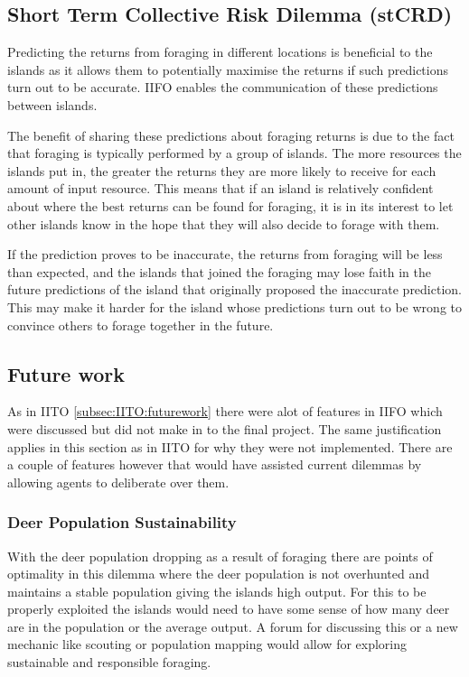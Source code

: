 \subsection{Short Term Collective Risk Dilemma (stCRD)}
\label{subsec:IIFO:stCRD}

Predicting the returns from foraging in different locations is beneficial to the islands as it allows them to potentially maximise the returns if such predictions turn out to be accurate. IIFO enables the communication of these predictions between islands.

The benefit of sharing these predictions about foraging returns is due to the fact that foraging is typically performed by a group of islands. The more resources the islands put in, the greater the returns they are more likely to receive for each amount of input resource. This means that if an island is relatively confident about where the best returns can be found for foraging, it is in its interest to let other islands know in the hope that they will also decide to forage with them.

If the prediction proves to be inaccurate, the returns from foraging will be less than expected, and the islands that joined the foraging may lose faith in the future predictions of the island that originally proposed the inaccurate prediction. This may make it harder for the island whose predictions turn out to be wrong to convince others to forage together in the future.
\subsection{Future work}
As in IITO \ref{subsec:IITO:futurework} there were alot of features in IIFO which were discussed but did not make in to the final project. The same justification applies in this section as in IITO for why they were not implemented. There are a couple of features however that would have assisted current dilemmas by allowing agents to deliberate over them.
\subsubsection{Deer Population Sustainability}
With the deer population dropping as a result of foraging there are points of optimality in this dilemma where the deer population is not overhunted and maintains a stable population giving the islands high output. For this to be properly exploited the islands would need to have some sense of how many deer are in the population or the average output. A forum for discussing this or a new mechanic like scouting or population mapping would allow for exploring sustainable and responsible foraging.
